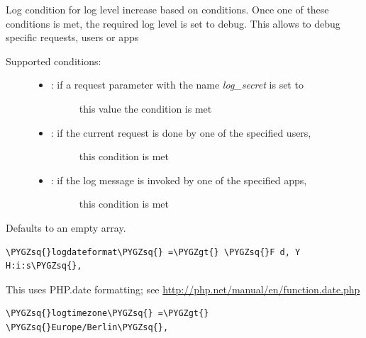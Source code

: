 \documentclass[letterpaper,10pt,english]{sphinxmanual}
\def\PYGZgt{\char`\>}
\def\PYGZsq{\char`\'}
\renewcommand\PYGZsq{\textquotesingle}
\begin{document}
Log condition for log level increase based on conditions. Once one of these
conditions is met, the required log level is set to debug. This allows to
debug specific requests, users or apps
\begin{description}
\item[{Supported conditions:}] \leavevmode\begin{itemize}
\item {} \begin{description}
\item[{: if a request parameter with the name \emph{log\_secret} is set to}] \leavevmode
this value the condition is met

\end{description}

\item {} \begin{description}
\item[{:  if the current request is done by one of the specified users,}] \leavevmode
this condition is met

\end{description}

\item {} \begin{description}
\item[{:   if the log message is invoked by one of the specified apps,}] \leavevmode
this condition is met

\end{description}

\end{itemize}

\end{description}

Defaults to an empty array.

\begin{Verbatim}[commandchars=\\\{\}]
\PYGZsq{}logdateformat\PYGZsq{} =\PYGZgt{} \PYGZsq{}F d, Y H:i:s\PYGZsq{},
\end{Verbatim}

This uses PHP.date formatting; see \href{http://php.net/manual/en/function.date.php}{http://php.net/manual/en/function.date.php}

\begin{Verbatim}[commandchars=\\\{\}]
\PYGZsq{}logtimezone\PYGZsq{} =\PYGZgt{} \PYGZsq{}Europe/Berlin\PYGZsq{},
\end{Verbatim}
\end{document}
